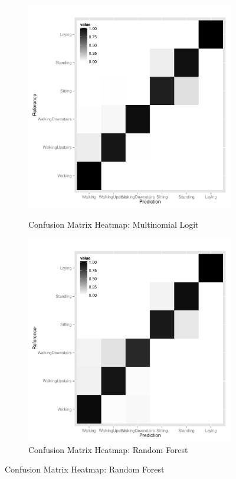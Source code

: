 \begin{landscape}
\begin{figure}
  \centering
  \begin{subfigure}[b]{0.45\textwidth}
    \caption{Confusion Matrix Heatmap: Multinomial Logit}
    \includegraphics[width=\textwidth]{heatmap_dmr.pdf}
    \label{fig:lift_lin}
  \end{subfigure}
  \hfill
  \begin{subfigure}[b]{0.45\textwidth}
    \caption{Confusion Matrix Heatmap: Random Forest}
    \includegraphics[width=\textwidth]{heatmap_rf.pdf}

\end{subfigure}
\end{figure}
\end{landscape}
